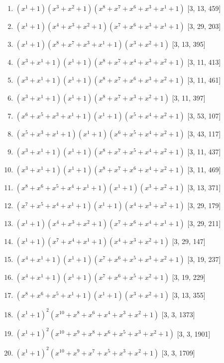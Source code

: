 \documentclass[10pt,twocolumn]{article}
\begin{document}
\begin{enumerate}
\item $(x^{1} + 1)(x^{3} + x^{2} + 1)(x^{8} + x^{7} + x^{6} + x^{3} + x^{1} + 1)$  [3, 13, 459]
\item $(x^{1} + 1)(x^{4} + x^{3} + x^{2} + 1)(x^{7} + x^{6} + x^{3} + x^{1} + 1)$  [3, 29, 203]
\item $(x^{1} + 1)(x^{8} + x^{7} + x^{3} + x^{1} + 1)(x^{3} + x^{2} + 1)$  [3, 13, 395]
\item $(x^{3} + x^{1} + 1)(x^{1} + 1)(x^{8} + x^{7} + x^{4} + x^{3} + x^{2} + 1)$  [3, 11, 413]
\item $(x^{3} + x^{1} + 1)(x^{1} + 1)(x^{8} + x^{7} + x^{6} + x^{3} + x^{2} + 1)$  [3, 11, 461]
\item $(x^{3} + x^{1} + 1)(x^{1} + 1)(x^{8} + x^{7} + x^{3} + x^{2} + 1)$  [3, 11, 397]
\item $(x^{6} + x^{5} + x^{3} + x^{1} + 1)(x^{1} + 1)(x^{5} + x^{4} + x^{2} + 1)$  [3, 53, 107]
\item $(x^{5} + x^{3} + x^{1} + 1)(x^{1} + 1)(x^{6} + x^{5} + x^{4} + x^{2} + 1)$  [3, 43, 117]
\item $(x^{3} + x^{1} + 1)(x^{1} + 1)(x^{8} + x^{7} + x^{5} + x^{4} + x^{2} + 1)$  [3, 11, 437]
\item $(x^{3} + x^{1} + 1)(x^{1} + 1)(x^{8} + x^{7} + x^{6} + x^{4} + x^{2} + 1)$  [3, 11, 469]
\item $(x^{8} + x^{6} + x^{5} + x^{4} + x^{1} + 1)(x^{1} + 1)(x^{3} + x^{2} + 1)$  [3, 13, 371]
\item $(x^{7} + x^{5} + x^{4} + x^{1} + 1)(x^{1} + 1)(x^{4} + x^{3} + x^{2} + 1)$  [3, 29, 179]
\item $(x^{1} + 1)(x^{4} + x^{3} + x^{2} + 1)(x^{7} + x^{6} + x^{4} + x^{1} + 1)$  [3, 29, 211]
\item $(x^{1} + 1)(x^{7} + x^{4} + x^{1} + 1)(x^{4} + x^{3} + x^{2} + 1)$  [3, 29, 147]
\item $(x^{4} + x^{1} + 1)(x^{1} + 1)(x^{7} + x^{6} + x^{5} + x^{3} + x^{2} + 1)$  [3, 19, 237]
\item $(x^{4} + x^{1} + 1)(x^{1} + 1)(x^{7} + x^{6} + x^{5} + x^{2} + 1)$  [3, 19, 229]
\item $(x^{8} + x^{6} + x^{5} + x^{1} + 1)(x^{1} + 1)(x^{3} + x^{2} + 1)$  [3, 13, 355]
\item $(x^{1} + 1)^{2}(x^{10} + x^{8} + x^{6} + x^{4} + x^{3} + x^{2} + 1)$  [3, 3, 1373]
\item $(x^{1} + 1)^{2}(x^{10} + x^{9} + x^{8} + x^{6} + x^{5} + x^{3} + x^{2} + 1)$  [3, 3, 1901]
\item $(x^{1} + 1)^{2}(x^{10} + x^{9} + x^{7} + x^{5} + x^{3} + x^{2} + 1)$  [3, 3, 1709]

\end{enumerate}
\end{document}
